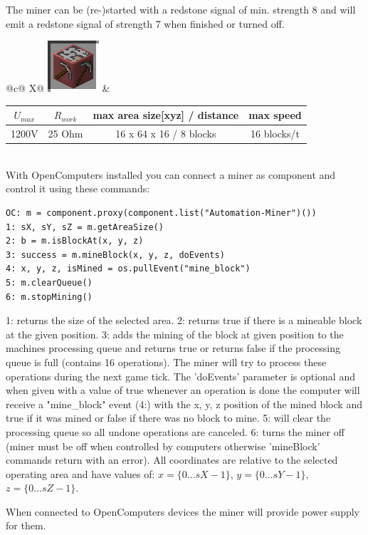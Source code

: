 \documentclass[11pt]{article} %
\makeatletter
\newcommand{\imgtex}{\begin{tabularx}{\textwidth}{@{}c@{ }X@{}}}
\makeatother
\begin{document}
The miner can be (re-)started with a redstone signal of min. strength 8 and will emit a redstone signal of strength 7 when finished or turned off.\\
\imgtex
\includegraphics[align = m]{blockMiner} &
\begin{tabular}{| c | c | c | c |} \hline
\bf $U_{max}$ & \bf $R_{work}$ & \bf max area size[xyz] / distance & \bf max speed \\ \hline
1200V & 25 Ohm & 16 x 64 x 16 / 8 blocks & 16 blocks/t \\ \hline
\end{tabular}
\end{tabularx} \\
With OpenComputers installed you can connect a miner as component and control it using these commands:
\begin{lstlisting}
OC: m = component.proxy(component.list("Automation-Miner")())
1: sX, sY, sZ = m.getAreaSize() 
2: b = m.isBlockAt(x, y, z) 
3: success = m.mineBlock(x, y, z, doEvents)
4: x, y, z, isMined = os.pullEvent("mine_block")
5: m.clearQueue()
6: m.stopMining()
\end{lstlisting}
1: returns the size of the selected area. 2: returns true if there is a mineable block at the given position. 3: adds the mining of the block at given position to the machines processing queue and returns true or returns false if the processing queue is full (contains 16 operations). The miner will try to process these operations during the next game tick. The 'doEvents' parameter is optional and when given with a value of true whenever an operation is done the computer will receive a "mine\_block" event (4:) with the x, y, z position of the mined block and true if it was mined or false if there was no block to mine. 5: will clear the processing queue so all undone operations are canceled. 6: turns the miner off (miner must be off when controlled by computers otherwise 'mineBlock' commands return with an error). All coordinates are relative to the selected operating area and have values of: $x=\{0 \dots sX-1\}$, $y=\{0 \dots sY - 1\}$, $z=\{0 \dots sZ - 1\}$.

When connected to OpenComputers devices the miner will provide power supply for them.
\end{document}
